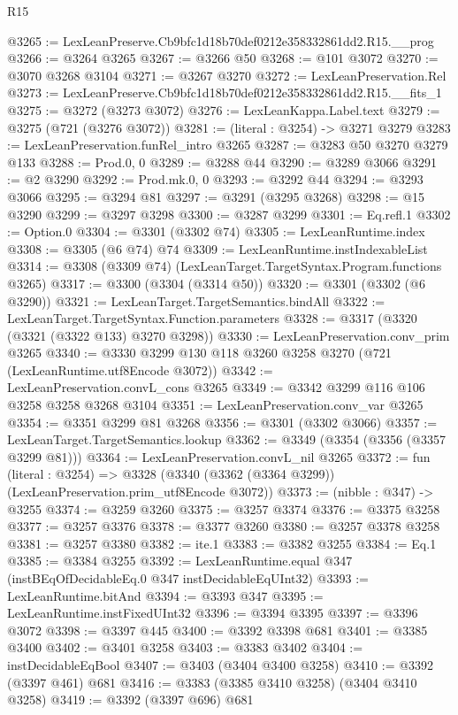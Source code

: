\begin{lexlean}{R15}
\begin{coremodule}
@3265 := LexLeanPreserve.Cb9bfc1d18b70def0212e358332861dd2.R15.__prog
@3266 := @3264 @3265
@3267 := @3266 @50
@3268 := @101 @3072
@3270 := @3070 @3268 @3104
@3271 := @3267 @3270
@3272 := LexLeanPreservation.Rel
@3273 := LexLeanPreserve.Cb9bfc1d18b70def0212e358332861dd2.R15.__fits_1
@3275 := @3272 (@3273 @3072)
@3276 := LexLeanKappa.Label.text
@3279 := @3275 (@721 (@3276 @3072))
@3281 := (literal : @3254) -> @3271 @3279
@3283 := LexLeanPreservation.funRel_intro @3265
@3287 := @3283 @50 @3270 @3279 @133
@3288 := Prod.{0, 0}
@3289 := @3288 @44
@3290 := @3289 @3066
@3291 := @2 @3290
@3292 := Prod.mk.{0, 0}
@3293 := @3292 @44
@3294 := @3293 @3066
@3295 := @3294 @81
@3297 := @3291 (@3295 @3268)
@3298 := @15 @3290
@3299 := @3297 @3298
@3300 := @3287 @3299
@3301 := Eq.refl.{1}
@3302 := Option.{0}
@3304 := @3301 (@3302 @74)
@3305 := LexLeanRuntime.index
@3308 := @3305 (@6 @74) @74
@3309 := LexLeanRuntime.instIndexableList
@3314 := @3308 (@3309 @74) (LexLeanTarget.TargetSyntax.Program.functions @3265)
@3317 := @3300 (@3304 (@3314 @50))
@3320 := @3301 (@3302 (@6 @3290))
@3321 := LexLeanTarget.TargetSemantics.bindAll
@3322 := LexLeanTarget.TargetSyntax.Function.parameters
@3328 := @3317 (@3320 (@3321 (@3322 @133) @3270 @3298))
@3330 := LexLeanPreservation.conv_prim @3265
@3340 := @3330 @3299 @130 @118 @3260 @3258 @3270 (@721 (LexLeanRuntime.utf8Encode @3072))
@3342 := LexLeanPreservation.convL_cons @3265
@3349 := @3342 @3299 @116 @106 @3258 @3258 @3268 @3104
@3351 := LexLeanPreservation.conv_var @3265
@3354 := @3351 @3299 @81 @3268
@3356 := @3301 (@3302 @3066)
@3357 := LexLeanTarget.TargetSemantics.lookup
@3362 := @3349 (@3354 (@3356 (@3357 @3299 @81)))
@3364 := LexLeanPreservation.convL_nil @3265
@3372 := fun (literal : @3254) =>
  @3328 (@3340 (@3362 (@3364 @3299)) (LexLeanPreservation.prim_utf8Encode @3072))
@3373 := (nibble : @347) -> @3255
@3374 := @3259 @3260
@3375 := @3257 @3374
@3376 := @3375 @3258
@3377 := @3257 @3376
@3378 := @3377 @3260
@3380 := @3257 @3378 @3258
@3381 := @3257 @3380
@3382 := ite.{1}
@3383 := @3382 @3255
@3384 := Eq.{1}
@3385 := @3384 @3255
@3392 := LexLeanRuntime.equal @347 (instBEqOfDecidableEq.{0} @347 instDecidableEqUInt32)
@3393 := LexLeanRuntime.bitAnd
@3394 := @3393 @347
@3395 := LexLeanRuntime.instFixedUInt32
@3396 := @3394 @3395
@3397 := @3396 @3072
@3398 := @3397 @445
@3400 := @3392 @3398 @681
@3401 := @3385 @3400
@3402 := @3401 @3258
@3403 := @3383 @3402
@3404 := instDecidableEqBool
@3407 := @3403 (@3404 @3400 @3258)
@3410 := @3392 (@3397 @461) @681
@3416 := @3383 (@3385 @3410 @3258) (@3404 @3410 @3258)
@3419 := @3392 (@3397 @696) @681

\end{coremodule}
\end{lexlean}
